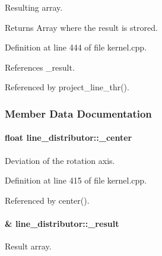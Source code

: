 Resulting array. 

\begin{DoxyReturn}{Returns}
Array where the result is strored. 
\end{DoxyReturn}


Definition at line 444 of file kernel.cpp.



References \_\-result.



Referenced by project\_\-line\_\-thr().



\subsubsection{Member Data Documentation}
\hypertarget{classline__distributor_a4c7d258ed09b1fb6838944176d3fde22}{
\paragraph[{\_\-center}]{\setlength{\rightskip}{0pt plus 5cm}float {\bf line\_\-distributor::\_\-center}}\hfill}
\label{classline__distributor_a4c7d258ed09b1fb6838944176d3fde22}


Deviation of the rotation axis. 



Definition at line 415 of file kernel.cpp.



Referenced by center().

\hypertarget{classline__distributor_acc0782b9128204f48b6dc413a28eb935}{
\paragraph[{\_\-result}]{\& {\bf line\_\-distributor::\_\-result}}\hfill}
\label{classline__distributor_acc0782b9128204f48b6dc413a28eb935}


Result array. 



